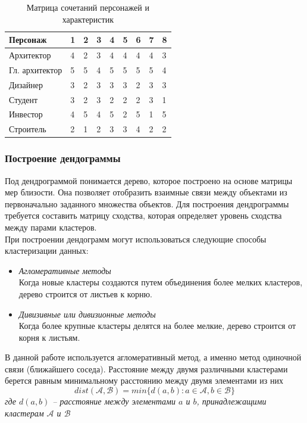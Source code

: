 \documentclass[a4paper,14pt]{extreport} %
\begin{document}
\begin{table}[H]
\caption {Матрица  сочетаний персонажей и характеристик} \label{tab:title}
\begin{center}
\begin{tabular}{| p{4cm}  | p{1cm} | p{1cm} | p{1cm} | p{1cm} | p{1cm} | p{1cm} | p{1cm} | p{1cm} |}
\hline
\textbf{Персонаж} & \textbf{1} & \textbf{2} & \textbf{3} & \textbf{4} & \textbf{5} & \textbf{6} & \textbf{7} & \textbf{8} \\
\hline
Архитектор 		& 4 & 2 & 3 & 4 & 4 & 4 & 4 & 3 \\
\hline
Гл. архитектор	& 5 & 5 & 4 & 5 & 5 & 5 & 5 & 4 \\
\hline
Дизайнер			& 3 & 2 & 3 & 3 & 3 & 2 & 3 & 3 \\
\hline
Студент			& 3 & 2 & 3 & 2 & 2 & 2 & 3 & 1 \\
\hline
Инвестор			& 4 & 5 & 4 & 5 & 2 & 5 & 1 & 5 \\
\hline
Строитель		& 2 & 1 & 2 & 3 & 3 & 4 & 2 & 2 \\
\hline
\end{tabular}
\end{center}
\end{table}

\subsubsection{Построение дендограммы}

Под дендрограммой понимается дерево, которое построено на основе матрицы мер близости. Она позволяет отобразить взаимные связи между объектами из первоначально заданного множества объектов. Для построения дендрограммы требуется составить матрицу сходства, которая определяет уровень сходства между парами кластеров. \\
При построении дендограмм могут использоваться следующие способы кластеризации данных:
\begin{itemize}
\item {\it Агломеративные методы} \\
Когда новые кластеры создаются путем объединения более мелких кластеров, дерево строится от листьев к корню.
\item {\it Дивизивные или дивизионные методы} \\
Когда более крупные кластеры делятся на более мелкие, дерево строится от корня к листьям.
\end{itemize}
В данной работе используется агломеративный метод, а именно метод одиночной связи (ближайшего соседа).
Расстояние между двумя различными кластерами берется равным минимальному расстоянию между двумя элементами из них
\textit{
\begin{equation}
\label{dendogramm_algo}
 dist(\mathcal{A},\mathcal{B}) = min \{ d(a, b) : a \in \mathcal{A}, b \in \mathcal{B} \}
\end{equation}
где $d(a, b)$ -- расстояние между элементами $a$ и $b$, принадлежащими кластерам $\mathcal{A}$ и $\mathcal{B}$ 
}
\end{document}
